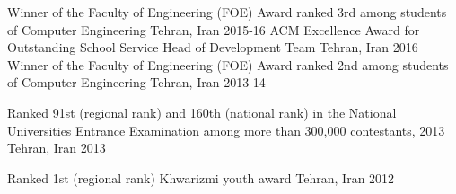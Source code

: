
\begin{cvhonors}

  \cvhonor
    {Winner of the Faculty of Engineering (FOE) Award} %
    {ranked 3rd among students of Computer Engineering} %
    {Tehran, Iran} %
    {2015-16} %
  \cvhonor
  	{ACM Excellence Award for Outstanding School Service}
  	{Head of Development Team}
  	{Tehran, Iran}
  	{2016}
  \cvhonor
    {Winner of the Faculty of Engineering (FOE) Award} %
    {ranked 2nd among students of Computer Engineering} %
    {Tehran, Iran} %
    {2013-14} %

  \cvhonor
    {Ranked 91st (regional rank)} %
    {and 160th (national rank) in the National Universities Entrance
Examination among more than 300,000 contestants, 2013} %
    {Tehran, Iran} %
    {2013} %
   
  \cvhonor
    {Ranked 1st (regional rank)} %
    {Khwarizmi youth award} %
    {Tehran, Iran} %
    {2012} %

\end{cvhonors}